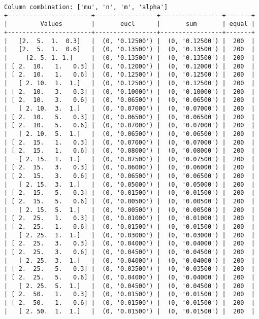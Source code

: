 \documentclass{article}
\begin{document}
\begin{verbatim}
Column combination: ['mu', 'n', 'm', 'alpha']
+-----------------------+-----------------+-----------------+-------+
|         Values        |       eucl      |       sum       | equal |
+-----------------------+-----------------+-----------------+-------+
|   [2.  5.  1.  0.3]   |  (0, '0.12500') |  (0, '0.12500') |  200  |
|   [2.  5.  1.  0.6]   |  (0, '0.13500') |  (0, '0.13500') |  200  |
|     [2. 5. 1. 1.]     |  (0, '0.13500') |  (0, '0.13500') |  200  |
| [ 2.  10.   1.   0.3] |  (0, '0.12000') |  (0, '0.12000') |  200  |
| [ 2.  10.   1.   0.6] |  (0, '0.12500') |  (0, '0.12500') |  200  |
|   [ 2. 10.  1.  1.]   |  (0, '0.12500') |  (0, '0.12500') |  200  |
| [ 2.  10.   3.   0.3] |  (0, '0.10000') |  (0, '0.10000') |  200  |
| [ 2.  10.   3.   0.6] |  (0, '0.06500') |  (0, '0.06500') |  200  |
|   [ 2. 10.  3.  1.]   |  (0, '0.07000') |  (0, '0.07000') |  200  |
| [ 2.  10.   5.   0.3] |  (0, '0.06500') |  (0, '0.06500') |  200  |
| [ 2.  10.   5.   0.6] |  (0, '0.07000') |  (0, '0.07000') |  200  |
|   [ 2. 10.  5.  1.]   |  (0, '0.06500') |  (0, '0.06500') |  200  |
| [ 2.  15.   1.   0.3] |  (0, '0.07000') |  (0, '0.07000') |  200  |
| [ 2.  15.   1.   0.6] |  (0, '0.08000') |  (0, '0.08000') |  200  |
|   [ 2. 15.  1.  1.]   |  (0, '0.07500') |  (0, '0.07500') |  200  |
| [ 2.  15.   3.   0.3] |  (0, '0.06000') |  (0, '0.06000') |  200  |
| [ 2.  15.   3.   0.6] |  (0, '0.06500') |  (0, '0.06500') |  200  |
|   [ 2. 15.  3.  1.]   |  (0, '0.05000') |  (0, '0.05000') |  200  |
| [ 2.  15.   5.   0.3] |  (0, '0.01500') |  (0, '0.01500') |  200  |
| [ 2.  15.   5.   0.6] |  (0, '0.00500') |  (0, '0.00500') |  200  |
|   [ 2. 15.  5.  1.]   |  (0, '0.00500') |  (0, '0.00500') |  200  |
| [ 2.  25.   1.   0.3] |  (0, '0.01000') |  (0, '0.01000') |  200  |
| [ 2.  25.   1.   0.6] |  (0, '0.01500') |  (0, '0.01500') |  200  |
|   [ 2. 25.  1.  1.]   |  (0, '0.03000') |  (0, '0.03000') |  200  |
| [ 2.  25.   3.   0.3] |  (0, '0.04000') |  (0, '0.04000') |  200  |
| [ 2.  25.   3.   0.6] |  (0, '0.04500') |  (0, '0.04500') |  200  |
|   [ 2. 25.  3.  1.]   |  (0, '0.04000') |  (0, '0.04000') |  200  |
| [ 2.  25.   5.   0.3] |  (0, '0.03500') |  (0, '0.03500') |  200  |
| [ 2.  25.   5.   0.6] |  (0, '0.04000') |  (0, '0.04000') |  200  |
|   [ 2. 25.  5.  1.]   |  (0, '0.04500') |  (0, '0.04500') |  200  |
| [ 2.  50.   1.   0.3] |  (0, '0.01500') |  (0, '0.01500') |  200  |
| [ 2.  50.   1.   0.6] |  (0, '0.01500') |  (0, '0.01500') |  200  |
|   [ 2. 50.  1.  1.]   |  (0, '0.01500') |  (0, '0.01500') |  200  |

\end{verbatim}
\end{document}
